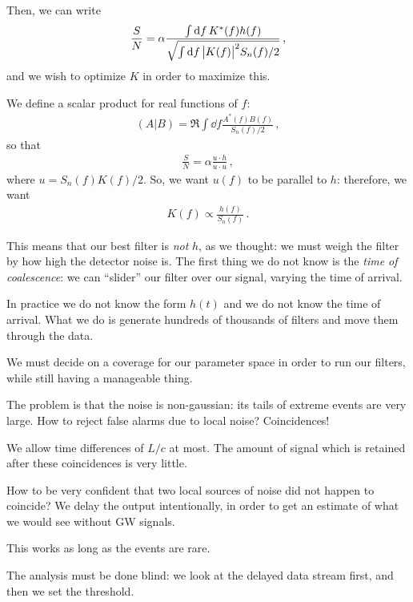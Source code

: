 \documentclass[main.tex]{subfiles}
\begin{document}

Then, we can write 
%
\begin{align}
\frac{S}{N} = \alpha \frac{\int \dd{f} K^{*} (f) h(f)}{\sqrt{\int \dd{f} \abs{K(f)}^2 S_n(f) / 2}}
\,,
\end{align}
%
and we wish to optimize \(K\) in order to maximize this. 

We define a scalar product for real functions of \(f\): 
%
\begin{align}
(A|B) = \Re \int \dd{f} \frac{A^{*}(f) B(f)}{S_n (f) / 2}
\,,
\end{align}
%
so that 
%
\begin{align}
\frac{S}{N} = \alpha \frac{u \cdot h}{u \cdot u }
\,,
\end{align}
%
where \(u = S_n(f) K(f) / 2\).
So, we want \(u(f)\) to be parallel to \(h\): therefore, we want 
%
\begin{align}
K(f) \propto \frac{h(f)}{S_n(f)}
\,.
\end{align}
%

This means that our best filter is \emph{not} \(h\), as we thought: we must weigh the filter by how high the detector noise is. 
The first thing we do not know is the \emph{time of coalescence}: we can ``slider'' our filter over our signal, varying the time of arrival. 

In practice we do not know the form \(h(t)\) and we do not know the time of arrival. 
What we do is generate hundreds of thousands of filters and move them through the data.

We must decide on a coverage for our parameter space in order to run our filters, while still having a manageable thing. 

The problem is that the noise is non-gaussian: its tails of extreme events are very large.
How to reject false alarms due to local noise? Coincidences!

We allow time differences of \(L/c\) at most. 
The amount of signal which is retained after these coincidences is very little. 

How to be very confident that two local sources of noise did not happen to coincide?
We delay the output intentionally, in order to get an estimate of what we would see without GW signals. 

This works as long as the events are rare. 

The analysis must be done blind: we look at the delayed data stream first, and then we set the threshold. 
\end{document}
